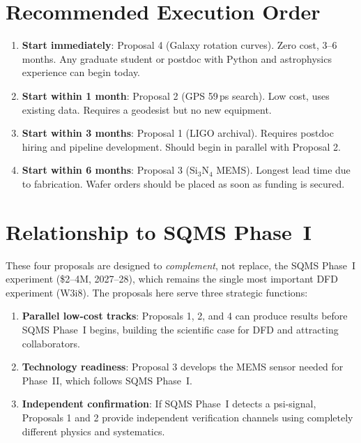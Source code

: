 \documentclass[11pt]{article}
\begin{document}
\section{Recommended Execution Order}

\begin{enumerate}
\item \textbf{Start immediately}: Proposal 4 (Galaxy rotation curves).
  Zero cost, 3--6 months. Any graduate student or postdoc with Python
  and astrophysics experience can begin today.

\item \textbf{Start within 1 month}: Proposal 2 (GPS 59\,ps search).
  Low cost, uses existing data. Requires a geodesist but no new
  equipment.

\item \textbf{Start within 3 months}: Proposal 1 (LIGO archival).
  Requires postdoc hiring and pipeline development. Should begin
  in parallel with Proposal 2.

\item \textbf{Start within 6 months}: Proposal 3 (Si$_3$N$_4$ MEMS).
  Longest lead time due to fabrication. Wafer orders should be placed
  as soon as funding is secured.
\end{enumerate}

\section{Relationship to SQMS Phase~I}

These four proposals are designed to \emph{complement}, not replace,
the SQMS Phase~I experiment (\$2--4M, 2027--28), which remains the
single most important DFD experiment (W3i8). The proposals here serve
three strategic functions:

\begin{enumerate}
\item \textbf{Parallel low-cost tracks}: Proposals 1, 2, and 4 can
  produce results before SQMS Phase~I begins, building the scientific
  case for DFD and attracting collaborators.

\item \textbf{Technology readiness}: Proposal 3 develops the MEMS
  sensor needed for Phase~II, which follows SQMS Phase~I.

\item \textbf{Independent confirmation}: If SQMS Phase~I detects
  a psi-signal, Proposals 1 and 2 provide independent verification
  channels using completely different physics and systematics.
\end{enumerate}
\end{document}
